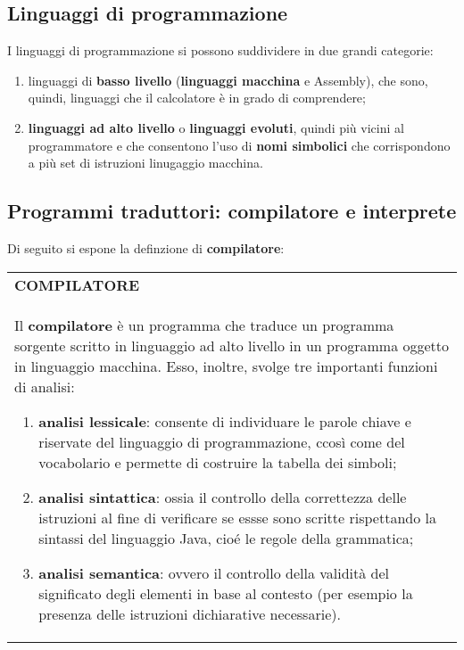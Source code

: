 \documentclass[a4paper]{extarticle}
\renewcommand\arraystretch{}
\begin{document}
\subsection{Linguaggi di programmazione}
I linguaggi di programmazione si possono suddividere in due grandi categorie:
\begin{enumerate}
  \item linguaggi di \textbf{basso livello} (\textbf{linguaggi macchina} e Assembly), che sono, quindi, linguaggi che il calcolatore è in grado di comprendere;
  \item \textbf{linguaggi ad alto livello} o \textbf{linguaggi evoluti}, quindi più vicini al programmatore e che consentono l'uso di \textbf{nomi simbolici} che corrispondono a più set di istruzioni linugaggio macchina.
\end{enumerate}

\vspace{1em}
\noindent
\subsection{Programmi traduttori: compilatore e interprete}
Di seguito si espone la definzione di \textbf{compilatore}:

\vspace{1em}
\setlength{\tabcolsep}{14pt}
\renewcommand{\arraystretch}{2}
\noindent
\begin{tabularx}{\textwidth}{@{}|P|@{}}
    \hline
    {\textbf{COMPILATORE}}\\
    \parbox{\linewidth}{Il \textbf{compilatore} è un programma che traduce un programma sorgente scritto in linguaggio ad alto livello in un programma oggetto in linguaggio macchina.\\
    Esso, inoltre, svolge tre importanti funzioni di analisi:
    \begin{enumerate}
      \item \textbf{analisi lessicale}: consente di individuare le parole chiave e riservate del linguaggio di programmazione, ccosì come del vocabolario e permette di costruire la tabella dei simboli;
      \item \textbf{analisi sintattica}: ossia il controllo della correttezza delle istruzioni al fine di verificare se essse sono scritte rispettando la sintassi del linguaggio Java, cioé le regole della grammatica;
      \item \textbf{analisi semantica}: ovvero il controllo della validità del significato degli elementi in base al contesto (per esempio la presenza delle istruzioni dichiarative necessarie).
    \end{enumerate}
    \vspace{-1mm}}\\
    \hline
\end{tabularx}
\end{document}
